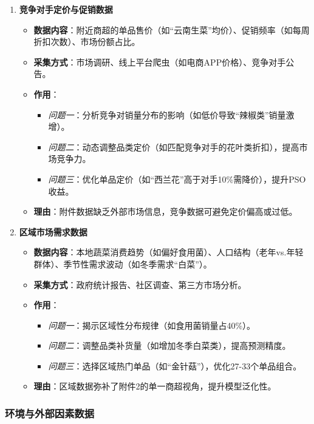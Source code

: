 \documentclass{cumcmthesis} %
\begin{document}
\begin{enumerate}
\item \textbf{竞争对手定价与促销数据}
\begin{itemize}
\item \textbf{数据内容}：附近商超的单品售价（如“云南生菜”均价）、促销频率（如每周折扣次数）、市场份额占比。
\item \textbf{采集方式}：市场调研、线上平台爬虫（如电商APP价格）、竞争对手公告。
\item \textbf{作用}：
\begin{itemize}
\item \textit{问题一}：分析竞争对销量分布的影响（如低价导致“辣椒类”销量激增）。
\item \textit{问题二}：动态调整品类定价（如匹配竞争对手的花叶类折扣），提高市场竞争力。
\item \textit{问题三}：优化单品定价（如“西兰花”高于对手10\%需降价），提升PSO收益。
\end{itemize}
\item \textbf{理由}：附件数据缺乏外部市场信息，竞争数据可避免定价偏高或过低。
\end{itemize}

\item \textbf{区域市场需求数据}
\begin{itemize}
\item \textbf{数据内容}：本地蔬菜消费趋势（如偏好食用菌）、人口结构（老年vs.年轻群体）、季节性需求波动（如冬季需求“白菜”）。
\item \textbf{采集方式}：政府统计报告、社区调查、第三方市场分析。
\item \textbf{作用}：
\begin{itemize}
\item \textit{问题一}：揭示区域性分布规律（如食用菌销量占40\%）。
\item \textit{问题二}：调整品类补货量（如增加冬季白菜类），提高预测精度。
\item \textit{问题三}：选择区域热门单品（如“金针菇”），优化27-33个单品组合。
\end{itemize}
\item \textbf{理由}：区域数据弥补了附件2的单一商超视角，提升模型泛化性。
\end{itemize}
\end{enumerate}

\subsubsection{环境与外部因素数据}
\end{document}
